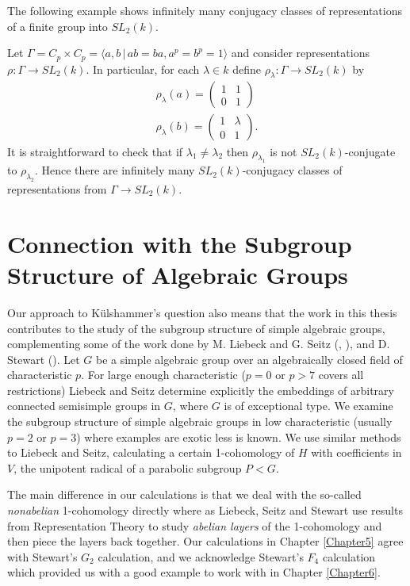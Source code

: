 The following example shows infinitely many conjugacy classes of representations of a finite group into $SL_2(k)$.
\begin{example}
  Let $\Gamma = C_p \times C_p = \langle a, b \,|\, ab = ba, a^p = b^p = 1 \rangle$ and consider representations $\rho: \Gamma \rightarrow SL_2(k)$. In particular, for each $\lambda \in k$ define $\rho_\lambda: \Gamma \rightarrow SL_2(k)$ by
  \begin{align*}
    \rho_\lambda(a) = \left( \begin{matrix} 1 & 1 \\ 0 & 1 \end{matrix} \right) \\
    \rho_\lambda(b) = \left( \begin{matrix} 1 & \lambda \\ 0 & 1 \end{matrix} \right).
  \end{align*}
  It is straightforward to check that if $\lambda_1 \neq \lambda_2$ then $\rho_{\lambda_1}$ is not $SL_2(k)$-conjugate to $\rho_{\lambda_2}$. Hence there are infinitely many $SL_2(k)$-conjugacy classes of representations from $\Gamma \rightarrow SL_2(k)$.
\end{example}

\section{Connection with the Subgroup Structure of Algebraic Groups}

Our approach to K\"ulshammer's question also means that the work in this thesis contributes to the study of the subgroup structure of simple algebraic groups, complementing some of the work done by M. Liebeck and G. Seitz (\cite{liebeck1996reductive}, \cite{liebeck2004maximal}), and D. Stewart (\cite{stewart2010g}). Let $G$ be a simple algebraic group over an algebraically closed field of characteristic $p$. For large enough characteristic ($p=0$ or $p>7$ covers all restrictions) Liebeck and Seitz determine explicitly the embeddings of arbitrary connected semisimple groups in $G$, where $G$ is of exceptional type. We examine the subgroup structure of simple algebraic groups in low characteristic (usually $p=2$ or $p=3$) where examples are exotic less is known. We use similar methods to Liebeck and Seitz, calculating a certain 1-cohomology of $H$ with coefficients in $V$, the unipotent radical of a parabolic subgroup $P < G$.

The main difference in our calculations is that we deal with the so-called \emph{nonabelian} 1-cohomology directly where as Liebeck, Seitz and Stewart use results from Representation Theory to study \emph{abelian layers} of the 1-cohomology and then piece the layers back together. Our calculations in Chapter \ref{Chapter5} agree with Stewart's $G_2$ calculation, and we acknowledge Stewart's $F_4$ calculation which provided us with a good example to work with in Chapter \ref{Chapter6}.

